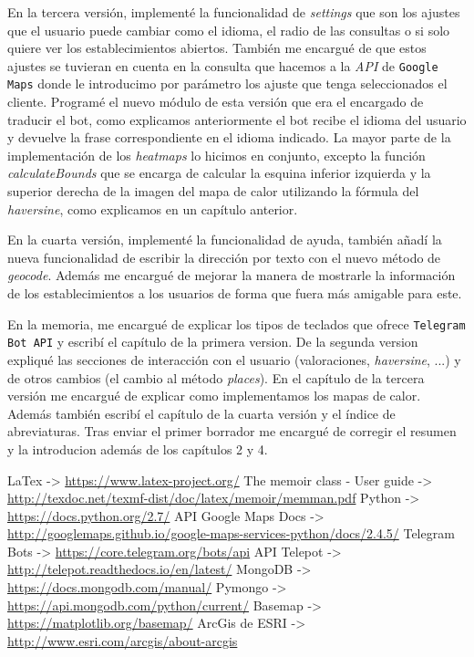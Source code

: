 \documentclass[oneside]{memoir}
\begin{document}
En la tercera versión, implementé la funcionalidad de \textit{settings} que son los ajustes que el usuario puede cambiar como el idioma, el radio de las consultas o si solo quiere ver los establecimientos abiertos. También me encargué de que estos ajustes se tuvieran en cuenta en la consulta que hacemos a la \textit{API} de \texttt{Google Maps} donde le introducimo por parámetro los ajuste que tenga seleccionados el cliente. Programé el nuevo módulo de esta versión que era el encargado de traducir el bot, como explicamos anteriormente el bot recibe el idioma del usuario y devuelve la frase correspondiente en el idioma indicado. La mayor parte de la implementación de los \textit{heatmaps} lo hicimos en conjunto, excepto la función \textit{calculateBounds} que se encarga de calcular la esquina inferior izquierda y la superior derecha de la imagen del mapa de calor utilizando la fórmula del \textit{haversine}, como explicamos en un capítulo anterior.

En la cuarta versión, implementé la funcionalidad de ayuda, también añadí la nueva funcionalidad de escribir la dirección por texto con el nuevo método de \textit{geocode}. Además me encargué de mejorar la manera de mostrarle la información de los establecimientos a los usuarios de forma que fuera más amigable para este.

En la memoria, me encargué de explicar los tipos de teclados que ofrece \texttt{Telegram Bot API} y escribí el capítulo de la primera version. De la segunda version expliqué las secciones de interacción con el usuario (valoraciones, \textit{haversine}, ...) y de otros cambios (el cambio al método \textit{places}). En el capítulo de la tercera versión me encargué de explicar como implementamos los mapas de calor. Además también escribí el capítulo de la cuarta versión y el índice de abreviaturas. Tras enviar el primer borrador me encargué de corregir el resumen y la introducion además de los capítulos 2 y 4.

\newpage
\begin{thebibliography}{}
LaTex -> \url{https://www.latex-project.org/}
The memoir class - User guide -> \url{http://texdoc.net/texmf-dist/doc/latex/memoir/memman.pdf} 
Python -> \url{https://docs.python.org/2.7/}
API Google Maps Docs -> \url{http://googlemaps.github.io/google-maps-services-python/docs/2.4.5/}
Telegram Bots -> \url{https://core.telegram.org/bots/api}
API Telepot -> \url{http://telepot.readthedocs.io/en/latest/}
MongoDB -> \url{https://docs.mongodb.com/manual/}
Pymongo -> \url{https://api.mongodb.com/python/current/}
Basemap -> \url{https://matplotlib.org/basemap/}
ArcGis de ESRI -> \url{http://www.esri.com/arcgis/about-arcgis}


\end{thebibliography}
\end{document}
